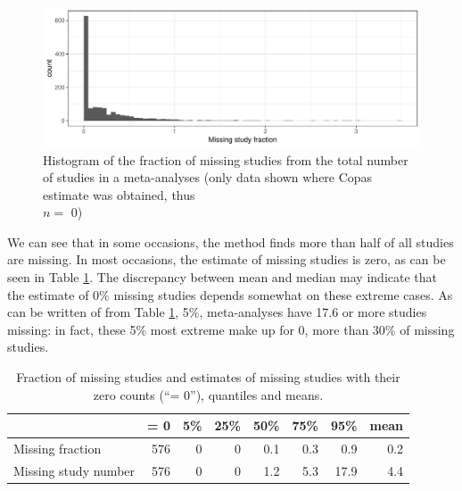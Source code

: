 \documentclass[11pt,a4paper,twoside]{book}\usepackage[]{graphicx}\usepackage[]{color}
\newenvironment{knitrout}{}{} %
\begin{document}
\begin{figure}
\begin{knitrout}
\color{fgcolor}

{\centering \includegraphics[width=\textwidth-3cm]{figure/ch03_figunnamed-chunk-20-1} 

}



\end{knitrout}
\caption{Histogram of the fraction of missing studies from the total number of studies in a meta-analyses (only data shown where Copas estimate was obtained, thus \\$n =$ 0)}
\label{fig:copas.missing}
\end{figure}

We can see that in some occasions, the method finds more than half of all studies are missing. In most occasions, the estimate of missing studies is zero, as can be seen in Table \ref{copas.missing}. The discrepancy between mean and median may indicate that the estimate of 0\% missing studies depends somewhat on these extreme cases. As can be written of from Table \ref{copas.missing}, 5\%,  meta-analyses have 17.6 or more studies missing: in fact, these 5\% most extreme make up for 0, more than 30\% of missing studies.

\begin{table}[ht]
\centering
\begingroup\footnotesize
\begin{tabular}{lrrrrrrr}
  \hline
 & = 0 & 5\% & 25\% & 50\% & 75\% & 95\% & mean \\ 
  \hline
Missing fraction & 576 & 0 & 0 & 0.1 & 0.3 & 0.9 & 0.2 \\ 
  Missing study number & 576 & 0 & 0 & 1.2 & 5.3 & 17.9 & 4.4 \\ 
   \hline
\end{tabular}
\endgroup
\caption{Fraction of missing studies and estimates of missing studies with their zero counts (``= 0''), quantiles and means.} 
\label{copas.missing}
\end{table}
\end{document}
